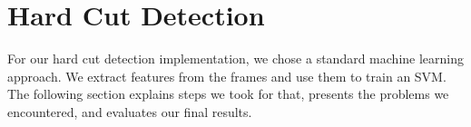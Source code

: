 \section{Hard Cut Detection}
\label{sec:hard_cut}

For our hard cut detection implementation, we chose a standard machine learning approach.
We extract features from the frames and use them to train an SVM.
The following section explains steps we took for that, presents the problems we encountered, and evaluates our final results.




